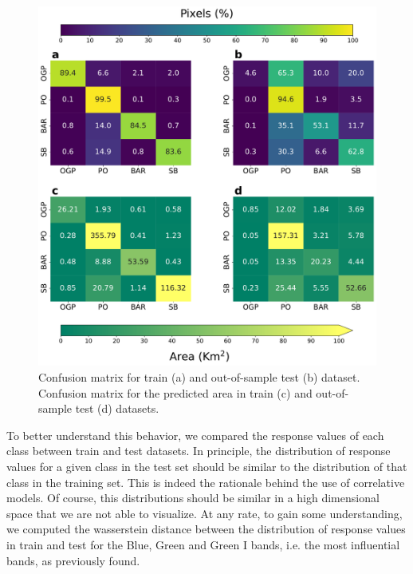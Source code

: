 \begin{figure}[H]
    \centering
    \includegraphics[width=\textwidth]{Figures/Confusion_matrix.pdf}
    \caption{Confusion matrix for train (a) and out-of-sample test (b)
        dataset. Confusion matrix for the predicted area in train (c) and
        out-of-sample
        test (d) datasets.}
    \label{fig:confusion_matrix}
\end{figure}

To better understand this behavior, we compared the response values of each
class between train and test datasets. In principle, the distribution of
response values for a given class in the test set should be similar to the
distribution of that class in the training set. This is indeed the rationale
behind the use of correlative models. Of course, this distributions should be
similar in a high dimensional space that we are not able to visualize. At any
rate, to gain some understanding, we computed the wasserstein distance between
the distribution of response values in train and test for the Blue, Green and
Green I bands, i.e. the most influential bands, as previously found.


